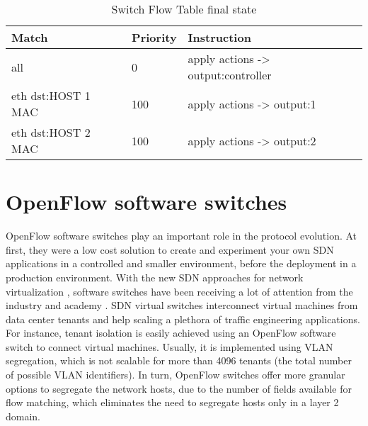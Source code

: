 \begin{enumerate}
\begin{table}[H]
\centering
\caption{Switch Flow Table final state}
\label{tab:finaltable}
\begin{tabular}{|l|l|l|}
\hline
\textbf{Match}                 & \textbf{Priority}   & \textbf{Instruction}                              \\ \hline
all                            & 0                   & apply actions -> output:controller                \\ \hline
eth dst:HOST 1 MAC             & 100                 & apply actions -> output:1                         \\ \hline
eth dst:HOST 2 MAC             & 100                 & apply actions -> output:2                         \\ \hline
\end{tabular}
\end{table}


\end{enumerate}        

\section{OpenFlow software switches}
\label{sec:sec22}

OpenFlow software switches play an important role in the protocol evolution. At first, they were a low cost solution to create and experiment your own SDN applications in a controlled and smaller environment, before the deployment in a production environment. With the new SDN approaches for network virtualization \cite{Tseng:2011:NVC:2117686.2118540} \cite{Drutskoy_scalablenetwork}, software switches have been receiving a lot of attention from the industry \cite{NSX} and academy \cite{DBLP:confcloudnetEmmerichRWC14}. SDN virtual switches interconnect virtual machines from data center tenants and help scaling a plethora of traffic engineering applications. For instance, tenant isolation is easily achieved using an OpenFlow software switch to connect virtual machines. Usually, it is implemented using VLAN segregation, which is not scalable for more than 4096 tenants (the total number of possible VLAN identifiers). In turn, OpenFlow switches offer more granular options to segregate the network hosts, due to the number of fields available for flow matching, which eliminates the need to segregate hosts only in a layer 2 domain.

